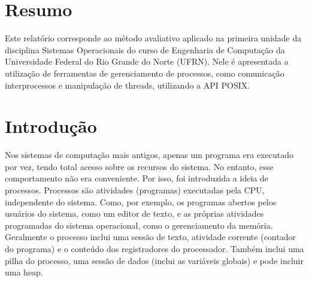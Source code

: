 \documentclass[
	article,			%
	11pt,				%
	oneside,			%
	a4paper,			%
	english,			%
	brazil,				%
	sumario=tradicional
	]{abntex2}
\begin{document}

\frenchspacing 


%
%
\imprimircapa

\imprimirfolhaderosto

\section*{Resumo}
Este relatório corresponde ao método avaliativo aplicado na primeira unidade da disciplina Sistemas Operacionais do curso de Engenharia de Computação da Universidade Federal do Rio Grande do Norte (UFRN). Nele é apresentada a utilização de ferramentas de gerenciamento de processos, como comunicação interprocessos e manipulação de threads, utilizando a API POSIX.
 
\newpage


\textual

\section*{Introdução}

Nos sistemas de computação mais antigos, apenas um programa era executado por vez, tendo total acesso sobre os recursos do sistema. No entanto, esse comportamento não era conveniente. Por isso, foi introduzida a ideia de processos. 
Processos são atividades (programas) executadas pela CPU, independente do sistema. Como, por exemplo, os programas abertos pelos usuários do sistema, como um editor de texto, e as próprias atividades programadas do sistema operacional, como o gerenciamento da memória. Geralmente o processo inclui uma sessão de texto, atividade corrente (contador do programa) e o conteúdo dos registradores do processador. Também inclui uma pilha do processo, uma sessão de dados (inclui as variáveis globais) e pode incluir uma heap.
\end{document}
